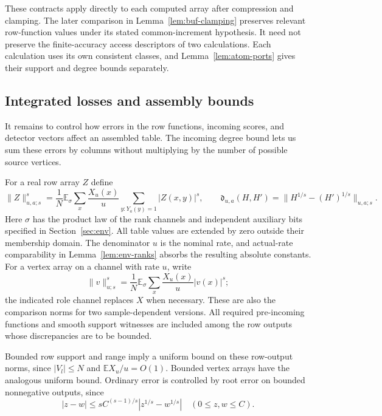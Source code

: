 These contracts apply directly to each computed array after compression
and clamping.  The later comparison in Lemma~\ref{lem:buf-clamping}
preserves relevant row-function values under its stated common-increment
hypothesis.  It need not preserve the finite-accuracy access descriptors
of two calculations.  Each calculation uses its own consistent classes,
and Lemma~\ref{lem:atom-ports} gives their support and degree bounds
separately.

\subsection{Integrated losses and assembly bounds}

It remains to control how errors in the row functions, incoming scores,
and detector vectors affect an assembled table.  The incoming degree
bound lets us sum these errors by columns without multiplying by the
number of possible source vertices.

For a real row array $Z$ define
\begin{equation}
 \|Z\|_{u,a;s}^s=
 \frac1N\mathbb E_\sigma\sum_x\frac{X_u(x)}u
                 \sum_{y:Y_a(y)=1}|Z(x,y)|^s,
 \qquad
 \mathfrak d_{u,a}(H,H')=
   \|H^{1/s}-(H')^{1/s}\|_{u,a;s}.
 \label{eq:atom-row-norm}
\end{equation}
Here $\sigma$ has the product law of the rank channels and independent
auxiliary bits specified in Section~\ref{sec:env}.  All table values are
extended by zero outside their membership domain.  The denominator $u$
is the nominal rate, and actual-rate comparability in
Lemma~\ref{lem:env-ranks} absorbs the resulting absolute constants.
For a vertex array on a channel with rate $u$, write
\begin{equation}
 \|v\|_{u;s}^s=
    \frac1N\mathbb E_\sigma\sum_x\frac{X_u(x)}u|v(x)|^s;
 \label{eq:atom-vertex-norm}
\end{equation}
the indicated role channel replaces $X$ when necessary.  These are also
the comparison norms for two sample-dependent versions.  All required
pre-incoming functions and smooth support witnesses are included among
the row outputs whose discrepancies are to be bounded.

Bounded row support and range imply a uniform bound on these row-output
norms, since $|V_l|\le N$ and $\mathbb E X_u/u=O(1)$.  Bounded vertex
arrays have the analogous uniform bound.  Ordinary error is controlled
by root error on bounded nonnegative outputs, since
\begin{equation}
 |z-w|\le s C^{(s-1)/s}|z^{1/s}-w^{1/s}|
 \quad(0\le z,w\le C).
 \label{eq:atom-ordinary-from-root}
\end{equation}

